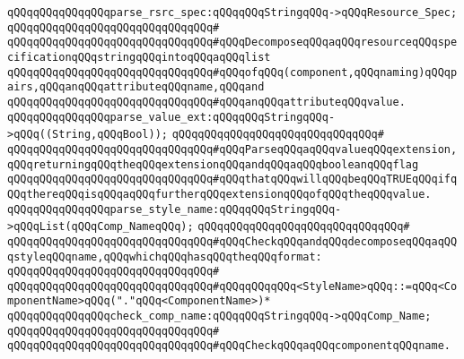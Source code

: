 \newline
\verb|qQQqqQQqqQQqqQQqparse_rsrc_spec:qQQqqQQqStringqQQq->qQQqResource_Spec;|\newline
\verb|qQQqqQQqqQQqqQQqqQQqqQQqqQQqqQQq#|\newline
\verb|qQQqqQQqqQQqqQQqqQQqqQQqqQQqqQQq#qQQqDecomposeqQQqaqQQqresourceqQQqspecificationqQQqstringqQQqintoqQQqaqQQqlist|\newline
\verb|qQQqqQQqqQQqqQQqqQQqqQQqqQQqqQQq#qQQqofqQQq(component,qQQqnaming)qQQqpairs,qQQqanqQQqattributeqQQqname,qQQqand|\newline
\verb|qQQqqQQqqQQqqQQqqQQqqQQqqQQqqQQq#qQQqanqQQqattributeqQQqvalue.|\newline
\newline
\newline
\verb|qQQqqQQqqQQqqQQqparse_value_ext:qQQqqQQqStringqQQq->qQQq((String,qQQqBool));|\newline
\verb|qQQqqQQqqQQqqQQqqQQqqQQqqQQqqQQq#|\newline
\verb|qQQqqQQqqQQqqQQqqQQqqQQqqQQqqQQq#qQQqParseqQQqaqQQqvalueqQQqextension,qQQqreturningqQQqtheqQQqextensionqQQqandqQQqaqQQqbooleanqQQqflag|\newline
\verb|qQQqqQQqqQQqqQQqqQQqqQQqqQQqqQQq#qQQqthatqQQqwillqQQqbeqQQqTRUEqQQqifqQQqthereqQQqisqQQqaqQQqfurtherqQQqextensionqQQqofqQQqtheqQQqvalue.|\newline
\newline
\newline
\verb|qQQqqQQqqQQqqQQqparse_style_name:qQQqqQQqStringqQQq->qQQqList(qQQqComp_NameqQQq);|\newline
\verb|qQQqqQQqqQQqqQQqqQQqqQQqqQQqqQQq#|\newline
\verb|qQQqqQQqqQQqqQQqqQQqqQQqqQQqqQQq#qQQqCheckqQQqandqQQqdecomposeqQQqaqQQqstyleqQQqname,qQQqwhichqQQqhasqQQqtheqQQqformat:|\newline
\verb|qQQqqQQqqQQqqQQqqQQqqQQqqQQqqQQq#|\newline
\verb|qQQqqQQqqQQqqQQqqQQqqQQqqQQqqQQq#qQQqqQQqqQQq<StyleName>qQQq::=qQQq<ComponentName>qQQq("."qQQq<ComponentName>)*|\newline
\newline
\newline
\verb|qQQqqQQqqQQqqQQqcheck_comp_name:qQQqqQQqStringqQQq->qQQqComp_Name;|\newline
\verb|qQQqqQQqqQQqqQQqqQQqqQQqqQQqqQQq#|\newline
\verb|qQQqqQQqqQQqqQQqqQQqqQQqqQQqqQQq#qQQqCheckqQQqaqQQqcomponentqQQqname.|\newline
